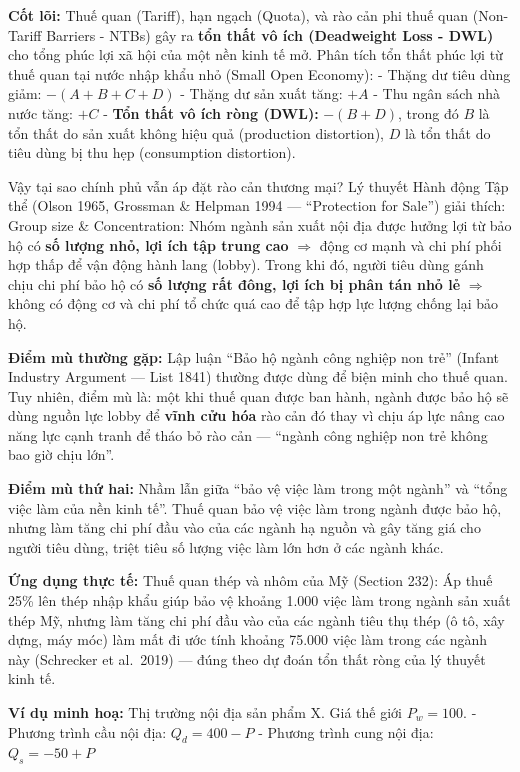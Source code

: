 \documentclass[
]{article}
\begin{document}
\textbf{Cốt lõi:} Thuế quan (Tariff), hạn ngạch (Quota), và rào cản phi
thuế quan (Non-Tariff Barriers - NTBs) gây ra \textbf{tổn thất vô ích
(Deadweight Loss - DWL)} cho tổng phúc lợi xã hội của một nền kinh tế
mở. Phân tích tổn thất phúc lợi từ thuế quan tại nước nhập khẩu nhỏ
(Small Open Economy): - Thặng dư tiêu dùng giảm: \(-(A + B + C + D)\) -
Thặng dư sản xuất tăng: \(+A\) - Thu ngân sách nhà nước tăng: \(+C\) -
\textbf{Tổn thất vô ích ròng (DWL):} \(-(B + D)\), trong đó \(B\) là tổn
thất do sản xuất không hiệu quả (production distortion), \(D\) là tổn
thất do tiêu dùng bị thu hẹp (consumption distortion).

Vậy tại sao chính phủ vẫn áp đặt rào cản thương mại? Lý thuyết Hành động
Tập thể (Olson 1965, Grossman \& Helpman 1994 --- ``Protection for
Sale'') giải thích: Group size \& Concentration: Nhóm ngành sản xuất nội
địa được hưởng lợi từ bảo hộ có \textbf{số lượng nhỏ, lợi ích tập trung
cao} \(\Rightarrow\) động cơ mạnh và chi phí phối hợp thấp để vận động
hành lang (lobby). Trong khi đó, người tiêu dùng gánh chịu chi phí bảo
hộ có \textbf{số lượng rất đông, lợi ích bị phân tán nhỏ lẻ}
\(\Rightarrow\) không có động cơ và chi phí tổ chức quá cao để tập hợp
lực lượng chống lại bảo hộ.

\textbf{Điểm mù thường gặp:} Lập luận ``Bảo hộ ngành công nghiệp non
trẻ'' (Infant Industry Argument --- List 1841) thường được dùng để biện
minh cho thuế quan. Tuy nhiên, điểm mù là: một khi thuế quan được ban
hành, ngành được bảo hộ sẽ dùng nguồn lực lobby để \textbf{vĩnh cửu hóa}
rào cản đó thay vì chịu áp lực nâng cao năng lực cạnh tranh để tháo bỏ
rào cản --- ``ngành công nghiệp non trẻ không bao giờ chịu lớn''.

\textbf{Điểm mù thứ hai:} Nhầm lẫn giữa ``bảo vệ việc làm trong một
ngành'' và ``tổng việc làm của nền kinh tế''. Thuế quan bảo vệ việc làm
trong ngành được bảo hộ, nhưng làm tăng chi phí đầu vào của các ngành hạ
nguồn và gây tăng giá cho người tiêu dùng, triệt tiêu số lượng việc làm
lớn hơn ở các ngành khác.

\textbf{Ứng dụng thực tế:} Thuế quan thép và nhôm của Mỹ (Section 232):
Áp thuế 25\% lên thép nhập khẩu giúp bảo vệ khoảng 1.000 việc làm trong
ngành sản xuất thép Mỹ, nhưng làm tăng chi phí đầu vào của các ngành
tiêu thụ thép (ô tô, xây dựng, máy móc) làm mất đi ước tính khoảng
75.000 việc làm trong các ngành này (Schrecker et al.~2019) --- đúng
theo dự đoán tổn thất ròng của lý thuyết kinh tế.

\textbf{Ví dụ minh hoạ:} Thị trường nội địa sản phẩm X. Giá thế giới
\(P_w = 100\). - Phương trình cầu nội địa: \(Q_d = 400 - P\) - Phương
trình cung nội địa: \(Q_s = -50 + P\)
\end{document}
